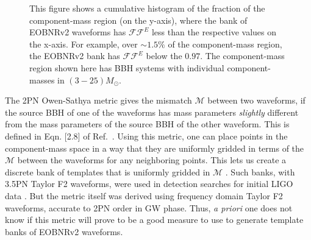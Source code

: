 \documentclass[aps,
prd,
amsmath,
amssymb,
twocolumn,
floatfix,
groupedaddress]{revtex4-1}
\begin{document}
\begin{figure}
	\begin{center}
	\end{center}
\caption{This figure shows a cumulative histogram of the fraction of the component-mass region (on the y-axis), where the bank of EOBNRv2 waveforms has $\mathcal{FF}^E$ less than the respective values on the x-axis. For example, over $\sim 1.5\%$ of the component-mass region, the EOBNRv2 bank has $\mathcal{FF}^E$ below the $0.97$. The component-mass region shown here has BBH systems with individual component-masses in $(3-25)M_{\odot}$.}
\label{fig:cumhist_eobeob_all}
\end{figure} 
The 2PN Owen-Sathya metric \citep{SathyaMetric2PN} gives the mismatch $\mathcal{M}$ between two waveforms, if the source BBH of one of the waveforms has mass parameters \textit{slightly} different from the mass parameters of the source BBH of the other waveform. This is defined in Eqn. [2.8] of Ref.~\citep{SathyaMetric2PN}. Using this metric, one can place points in the component-mass space in a way that they are uniformly gridded in terms of the $\mathcal{M}$ between the waveforms for any neighboring points. This lets us create a discrete bank of templates that is uniformly gridded in $\mathcal{M}$ \citep{BabaketalBankPlacement}. Such banks, with 3.5PN Taylor F2 waveforms, were used in detection searches for initial LIGO data \citep{Colaboration:2011nz,Abadie:2010yb,Abbott:2009qj,Abbott:2009tt,Messaritaki:2005wv}. But the metric itself was derived using frequency domain Taylor F2 waveforms, accurate to 2PN order in GW phase. Thus, \textit{a priori} one does not know if this metric will prove to be a good 
measure to use to generate template banks of EOBNRv2 waveforms.
\end{document}
